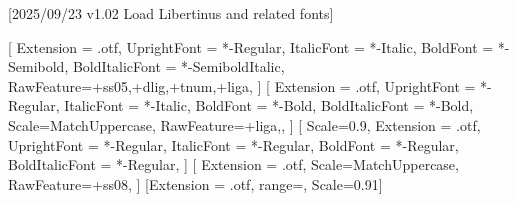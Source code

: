 
[2025/09/23 v1.02 Load Libertinus and related fonts]

%
%
\ifpdftex
    \RequirePackage[T1]{fontenc}
    \RequirePackage[lf,t,semibold,ScaleTT=0.9]{libertinus} %
    \RequirePackage{bm}%
\else
    \RequirePackage[warnings-off={mathtools-colon,mathtools-overbracket},mathbf=sym]{unicode-math}
    \setmainfont{LibertinusSerif}[%
    	Extension = .otf,
    	UprightFont = *-Regular,
    	ItalicFont = *-Italic,
    	BoldFont = *-Semibold, 
    	BoldItalicFont = *-SemiboldItalic,
    	RawFeature={+ss05,+dlig,+tnum,+liga}, 
    ]    
    \setsansfont{LibertinusSans}[%
    	Extension = .otf,
    	UprightFont = *-Regular,
    	ItalicFont = *-Italic,
    	BoldFont = *-Bold,
	    BoldItalicFont = *-Bold,%
    	Scale=MatchUppercase,
		RawFeature={+liga,},
	]
    \setmonofont{LibertinusMono}[%
    	Scale=0.9,%
	    Extension = .otf,
    	UprightFont = *-Regular,
    	ItalicFont = *-Regular,%
    	BoldFont = *-Regular,%
	    BoldItalicFont = *-Regular,%
	] 
	\newfontfamily{}%
	\newfontfamily{}%
    [%
     	Extension = .otf,   
    	Scale=MatchUppercase,
    	RawFeature={+ss08},%
    	]
	[Extension = .otf, range=\nabla, Scale=0.91] %
	
    \newcommand*{\FRAC}[1]{{\addfontfeature{Fractions=On}#1}}%
\fi
